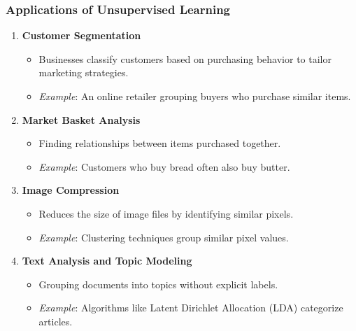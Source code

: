 \documentclass{beamer}
\begin{document}
\begin{frame}[fragile]
    \frametitle{Applications of Unsupervised Learning}
    \begin{enumerate}
        \item \textbf{Customer Segmentation}
            \begin{itemize}
                \item Businesses classify customers based on purchasing behavior to tailor marketing strategies.
                \item \textit{Example}: An online retailer grouping buyers who purchase similar items.
            \end{itemize}
        \item \textbf{Market Basket Analysis}
            \begin{itemize}
                \item Finding relationships between items purchased together.
                \item \textit{Example}: Customers who buy bread often also buy butter.
            \end{itemize}
        \item \textbf{Image Compression}
            \begin{itemize}
                \item Reduces the size of image files by identifying similar pixels.
                \item \textit{Example}: Clustering techniques group similar pixel values.
            \end{itemize}
        \item \textbf{Text Analysis and Topic Modeling}
            \begin{itemize}
                \item Grouping documents into topics without explicit labels.
                \item \textit{Example}: Algorithms like Latent Dirichlet Allocation (LDA) categorize articles.
            \end{itemize}
    \end{enumerate}
\end{frame}
\end{document}
